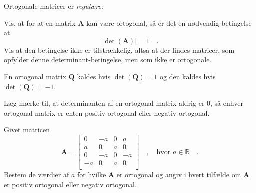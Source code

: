 Ortogonale matricer er {\em{regulære}}:

\begin{exercise}
Vis, at for at en matrix $\mathbf{A}$ kan være ortogonal, så er det en nødvendig betingelse at
\begin{equation}
| \det(\mathbf{A}) |  = 1 \quad .
\end{equation}
Vis at den betingelse ikke er tilstrækkelig, altså at der findes matricer, som opfylder denne determinant-betingelse, men som ikke er ortogonale.
\end{exercise}


\begin{definition}
En ortogonal matrix $\mathbf{Q}$ kaldes  hvis  $\det(\mathbf{Q}) =1 $ og
den kaldes   hvis  $\det(\mathbf{Q}) = -1$.
\end{definition}

\begin{aha}
 Læg mærke til, at determinanten af en ortogonal matrix aldrig er $0$, så enhver ortogonal matrix er enten positiv ortogonal  eller negativ ortogonal.
\end{aha}


\begin{exercise} \label{exercLA8.24}
Givet matricen
\begin{equation}
\mathbf{A} = \left[
           \begin{array}{rrrr}
             0 & -a & 0 & a \\
             a & 0 & a & 0\\
             0 & -a & 0 & -a \\
             -a & 0 & a & 0 \\
           \end{array}
         \right] \quad , \quad \textrm{hvor $a \in \mathbb{R}$} \quad .
\end{equation}
Bestem de værdier af $a$ for hvilke $\mathbf{A}$ er ortogonal og angiv i hvert tilfælde om $\mathbf{A}$ er positiv ortogonal eller negativ ortogonal.
\end{exercise}











